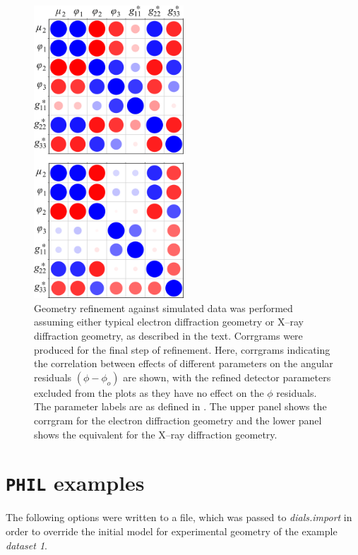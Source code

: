 \documentclass[preprint]{iucr}
\newcommand{\dialsimport}{\emph{dials.import}\xspace}
\newcommand{\code}{\texttt}
\begin{document}
\begin{figure}
  \label{fig:corrgram}
  \centering
  \caption{
    Geometry refinement against simulated data was performed assuming either
    typical electron diffraction geometry or X--ray diffraction geometry, as
    described in the text. Corrgrams were produced for the final step of
    refinement. Here, corrgrams indicating the correlation between effects of
    different parameters on the angular residuals $(\phi - \phi_o)$ are shown,
    with the refined detector parameters excluded from the plots as they have
    no effect on the $\phi$ residuals. The parameter labels are as defined in
    . The upper panel shows the corrgram for the
    electron diffraction geometry and the lower panel shows the equivalent for
    the X--ray diffraction geometry.
  }
  \includegraphics[width=0.5\textwidth]{Figures/simulation/corrgrams_phi.png}
\end{figure}

\appendix

\section{\code{PHIL} examples \label{app:PHIL_example}}

The following options were written to a file, which was passed to \dialsimport
in order to override the initial model for experimental geometry of the example
\emph{dataset 1}.
\end{document}
